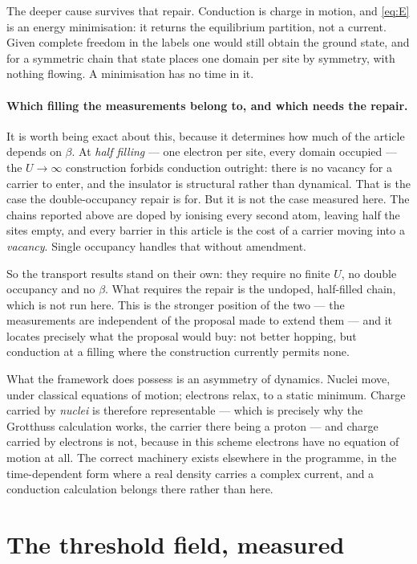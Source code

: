 \documentclass[11pt]{article}
\begin{document}
The deeper cause survives that repair. Conduction is charge in motion, and \eqref{eq:E} is an energy
minimisation: it returns the equilibrium partition, not a current. Given complete freedom in the
labels one would still obtain the ground state, and for a symmetric chain that state places one
domain per site by symmetry, with nothing flowing. A minimisation has no time in it.

\paragraph{Which filling the measurements belong to, and which needs the repair.} It is worth being
exact about this, because it determines how much of the article depends on $\beta$. At \emph{half
filling} --- one electron per site, every domain occupied --- the $U\to\infty$ construction forbids
conduction outright: there is no vacancy for a carrier to enter, and the insulator is structural
rather than dynamical. That is the case the double-occupancy repair is for. But it is not the case
measured here. The chains reported above are doped by ionising every second atom, leaving half the
sites empty, and every barrier in this article is the cost of a carrier moving into a \emph{vacancy}.
Single occupancy handles that without amendment.

So the transport results stand on their own: they require no finite $U$, no double occupancy and no
$\beta$. What requires the repair is the undoped, half-filled chain, which is not run here. This is
the stronger position of the two --- the measurements are independent of the proposal made to extend
them --- and it locates precisely what the proposal would buy: not better hopping, but conduction at
a filling where the construction currently permits none.

What the framework does possess is an asymmetry of dynamics. Nuclei move, under classical equations
of motion; electrons relax, to a static minimum. Charge carried by \emph{nuclei} is therefore
representable --- which is precisely why the Grotthuss calculation works, the carrier there being a
proton --- and charge carried by electrons is not, because in this scheme electrons have no equation
of motion at all. The correct machinery exists elsewhere in the programme, in the time-dependent form
where a real density carries a complex current, and a conduction calculation belongs there rather
than here.

\section{The threshold field, measured}\label{sec:threshold}
\end{document}
